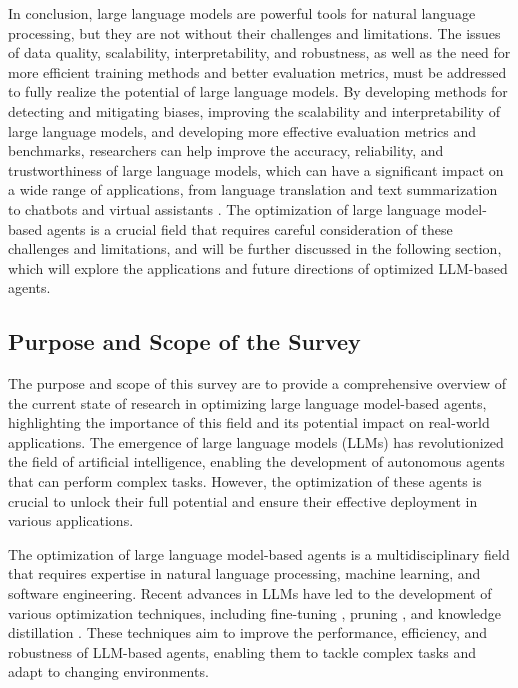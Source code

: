 \documentclass[11pt]{article}
\begin{document}
In conclusion, large language models are powerful tools for natural language processing, but they are not without their challenges and limitations. The issues of data quality, scalability, interpretability, and robustness, as well as the need for more efficient training methods and better evaluation metrics, must be addressed to fully realize the potential of large language models. By developing methods for detecting and mitigating biases, improving the scalability and interpretability of large language models, and developing more effective evaluation metrics and benchmarks, researchers can help improve the accuracy, reliability, and trustworthiness of large language models, which can have a significant impact on a wide range of applications, from language translation and text summarization to chatbots and virtual assistants \cite{ref44}. The optimization of large language model-based agents is a crucial field that requires careful consideration of these challenges and limitations, and will be further discussed in the following section, which will explore the applications and future directions of optimized LLM-based agents.

\subsection{Purpose and Scope of the Survey}

The purpose and scope of this survey are to provide a comprehensive overview of the current state of research in optimizing large language model-based agents, highlighting the importance of this field and its potential impact on real-world applications. The emergence of large language models (LLMs) \cite{ref45} has revolutionized the field of artificial intelligence, enabling the development of autonomous agents that can perform complex tasks. However, the optimization of these agents is crucial to unlock their full potential and ensure their effective deployment in various applications.

The optimization of large language model-based agents is a multidisciplinary field that requires expertise in natural language processing, machine learning, and software engineering. Recent advances in LLMs have led to the development of various optimization techniques, including fine-tuning \cite{ref18}, pruning \cite{ref46}, and knowledge distillation \cite{ref47}. These techniques aim to improve the performance, efficiency, and robustness of LLM-based agents, enabling them to tackle complex tasks and adapt to changing environments.
\end{document}
